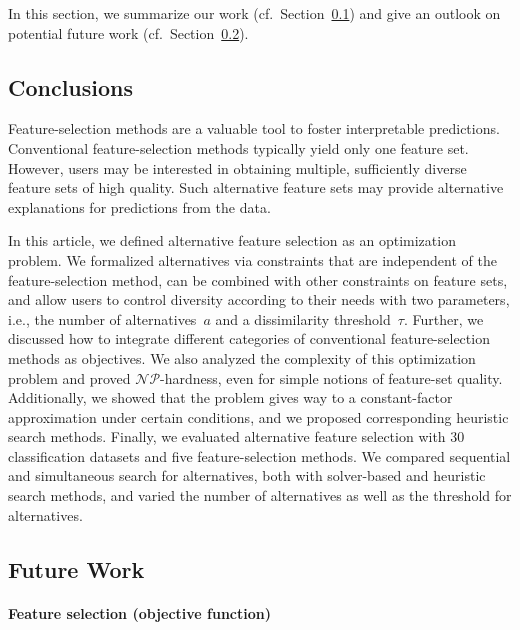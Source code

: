 \documentclass{article}
\theoremstyle{definition}
\begin{document}
In this section, we summarize our work (cf.~Section~\ref{sec:afs:conclusion:conclusion}) and give an outlook on potential future work (cf.~Section~\ref{sec:afs:conclusion:future-work}).

\subsection{Conclusions}
\label{sec:afs:conclusion:conclusion}

Feature-selection methods are a valuable tool to foster interpretable predictions.
Conventional feature-selection methods typically yield only one feature set.
However, users may be interested in obtaining multiple, sufficiently diverse feature sets of high quality.
Such alternative feature sets may provide alternative explanations for predictions from the data.

In this article, we defined alternative feature selection as an optimization problem.
We formalized alternatives via constraints that are independent of the feature-selection method, can be combined with other constraints on feature sets, and allow users to control diversity according to their needs with two parameters, i.e., the number of alternatives~$a$ and a dissimilarity threshold~$\tau$.
Further, we discussed how to integrate different categories of conventional feature-selection methods as objectives.
We also analyzed the complexity of this optimization problem and proved $\mathcal{NP}$-hardness, even for simple notions of feature-set quality.
Additionally, we showed that the problem gives way to a constant-factor approximation under certain conditions, and we proposed corresponding heuristic search methods.
Finally, we evaluated alternative feature selection with 30 classification datasets and five feature-selection methods.
We compared sequential and simultaneous search for alternatives, both with solver-based and heuristic search methods, and varied the number of alternatives as well as the threshold for alternatives.

\subsection{Future Work}
\label{sec:afs:conclusion:future-work}

\paragraph{Feature selection (objective function)}
\end{document}
